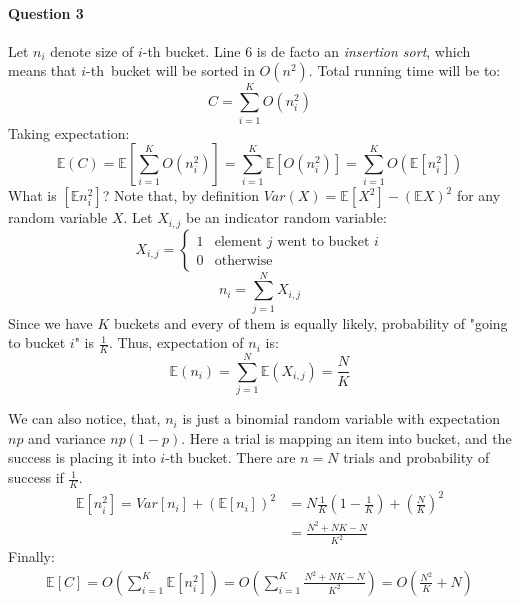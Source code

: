 \paragraph{Question 3}
Let $n_i$ denote size of $i$-th bucket.
Line $6$ is de facto an \emph{insertion sort}, which means that $i$-th~bucket will be sorted in $O(n^2)$.
Total running time will be  to:
\begin{equation*}
    C = \sum_{i=1}^{K} O(n_i^2)
\end{equation*}
Taking expectation:
\begin{equation*}
    \mathbb{E}(C) = \mathbb{E}[\sum_{i=1}^{K} O(n_i^2)]
                  = \sum_{i=1}^{K} \mathbb{E}[O(n_i^2)]
                  = \sum_{i=1}^{K} O(\mathbb{E}[n_i^2])
\end{equation*}
What is $[\mathbb{E}n_i^2]$? 
Note that, by definition $Var(X) = \mathbb{E}[X^2] - (\mathbb{E}X)^2$ for any random variable $X$.
Let $X_{i,j}$ be an indicator random variable:
\begin{equation*}
    X_{i,j} = \begin{cases}
    1 & \text{element $j$ went to bucket $i$} \\
    0 &  \text{otherwise}
    \end{cases}
\end{equation*}
\begin{equation*}
    n_i = \sum_{j=1}^{N} X_{i, j}
\end{equation*}
Since we have $K$ buckets and every of them is equally likely, probability of "going to bucket $i$" is $\frac{1}{K}$.
Thus, expectation of $n_i$ is:
\begin{equation*}
     \mathbb{E}(n_i) = \sum_{j=1}^{N} \mathbb{E}(X_{i, j}) = \frac{N}{K}
\end{equation*}

We can also notice, that, $n_i$ is just a binomial random variable with expectation $np$ and variance $np(1-p)$.
Here a trial is mapping an item into bucket, and the success is placing it into $i$-th bucket.
There are $n=N$ trials and probability of success if $\frac{1}{K}$.
\begin{align*}
    \mathbb{E}[n_i^2] = Var[n_i] + (\mathbb{E}[n_i])^2 &= N\frac{1}{K}(1-\frac{1}{K}) + (\frac{N}{K})^2 \\
    &= \frac{N^2 + NK - N}{K^2}
\end{align*}
Finally:
\begin{align*}
    \mathbb{E}[C]   = O(\sum_{i=1}^{K}\mathbb{E}[n_i^2]) 
                    = O(\sum_{i=1}^{K} \frac{N^2 + NK - N}{K^2})
                    = O(\frac{N^2}{K} + N)
\end{align*}

